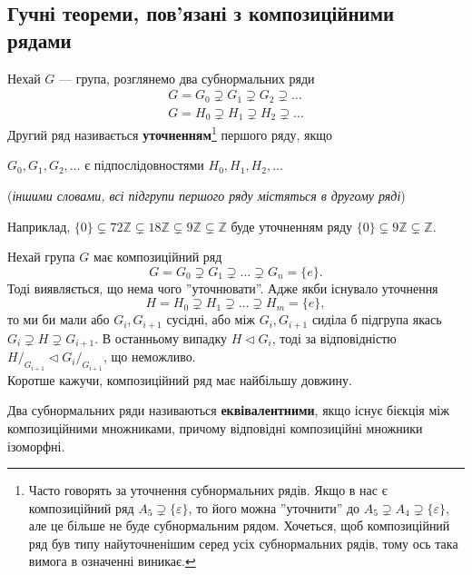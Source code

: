 \documentclass{math_library}
\begin{document}
\subsection{Гучні теореми, пов'язані з композиційними рядами}
\begin{definition}
Нехай $G$ --- група, розглянемо два субнормальних ряди
\begin{align*}
G = G_0 \supsetneq G_1 \supsetneq G_2 \supsetneq \dots \\
G = H_0 \supsetneq H_1 \supsetneq H_2 \supsetneq \dots
\end{align*}
Другий ряд називається \textbf{уточненням}\footnote{Часто говорять за уточнення субнормальних рядів. Якщо в нас є композиційний ряд $A_5 \supsetneq \{\varepsilon\}$, то його можна ''уточнити'' до $A_5 \supsetneq A_4 \supsetneq \{\varepsilon\}$, але це більше не буде субнормальним рядом. Хочеться, щоб композиційний ряд був типу найуточненішим серед усіх субнормальних рядів, тому ось така вимога в означенні виникає.} першого ряду, якщо
\begin{center}
$G_0,G_1,G_2,\dots$ є підпослідовностями $H_0,H_1,H_2,\dots$
\end{center}
(\textit{іншими словами, всі підгрупи першого ряду містяться в другому ряді})
\end{definition}

\begin{example}
Наприклад, $\{0\} \subsetneq 72 \mathbb{Z} \subsetneq 18 \mathbb{Z} \subsetneq 9 \mathbb{Z} \subsetneq \mathbb{Z}$ буде уточненням ряду $\{0\} \subsetneq 9 \mathbb{Z} \subsetneq \mathbb{Z}$.
\end{example}

\begin{remark}
Нехай група $G$ має композиційний ряд
\[
G = G_0 \supsetneq G_1 \supsetneq \dots \supsetneq G_n = \{e\}.
\]
Тоді виявляється, що нема чого ''уточнювати''. Адже якби існувало уточнення
\[
H = H_0 \supsetneq H_1 \supsetneq \dots \supsetneq H_m = \{e\},
\]
то ми би мали або $G_i, G_{i+1}$ сусідні, або між $G_i,G_{i+1}$ сиділа б підгрупа якась $G_i \supsetneq H \supsetneq G_{i+1}$. В останньому випадку $H \triangleleft G_{i}$, тоді за відповідністю $H/_{G_{i+1}} \triangleleft G_i/_{G_{i+1}}$, що неможливо.
\bigskip \\
Коротше кажучи, композиційний ряд має найбільшу довжину.
\end{remark}

\begin{definition}
Два субнормальних ряди називаються \textbf{еквівалентними}, якщо існує бієкція між композиційними множниками, причому відповідні композиційні множники ізоморфні.
\end{definition}
\end{document}
